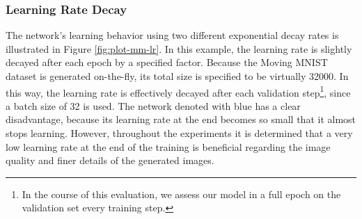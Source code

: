 \subsubsection*{Learning Rate Decay}

The network's learning behavior using two different exponential decay rates is illustrated in Figure \ref{fig:plot-mm-lr}. In this example, the learning rate is slightly decayed after each epoch by a specified factor. Because the Moving MNIST dataset is generated on-the-fly, its total size is specified to be virtually \num{32000}. In this way, the learning rate is effectively decayed after each validation step\footnote{In the course of this evaluation, we assess our model in a full epoch on the validation set every  training step.}, since a batch size of \num{32} is used. The network denoted with blue has a clear disadvantage, because its learning rate at the end becomes so small that it almost stops learning. However, throughout the experiments it is determined that a very low learning rate at the end of the training is beneficial regarding the image quality and finer details of the generated images.

